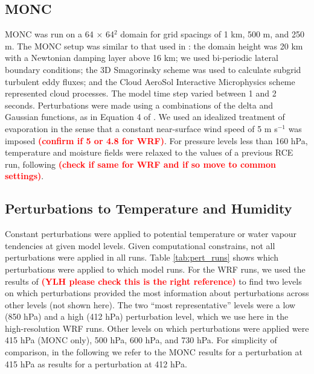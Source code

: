 \documentclass[draft]{agujournal2019}
\newcommand{\todo}[1]{\textcolor{red}{\textbf{(#1)}}}
\begin{document}
\subsection{MONC}

MONC was run on a 64 $\times$ 64$^2$ domain for grid spacings of 1 km, 500 m,
and 250 m. The MONC setup was similar to that used in :
the domain height was 20 km with a Newtonian damping layer above 16 km; we used
bi-periodic lateral boundary conditions; the 3D Smagorinsky scheme was used to
calculate subgrid turbulent eddy fluxes; and the Cloud AeroSol Interactive
Microphysics \cite<CASIM, see>[and references therein for previous
uses]{Daleu_QJRMS_2023} scheme represented cloud processes. The model time step
varied between 1 and 2 seconds. Perturbations were made using a combinations of
the delta and Gaussian functions, as in Equation 4 of .
We used an idealized treatment of evaporation in the sense that a constant
near-surface wind speed of 5 m s$^{-1}$ was imposed \todo{confirm if 5 or 4.8
for WRF}. For pressure levels less than 160 hPa, temperature and moisture fields
were relaxed to the values of a previous RCE run, following
\cite{Herman_JAMES_2013} \todo{check if same for WRF and if so move to common
settings}.

\subsection{Perturbations to Temperature and Humidity}

Constant perturbations were applied to potential temperature or water vapour
tendencies at given model levels. Given computational constrains, not all
perturbations were applied in all runs.  Table \ref{tab:pert_runs} shows which
perturbations were applied to which model runs. For the WRF runs, we used the
results of \cite{Hwong_JAMES_2021} \todo{YLH please check this is the right
reference} to find two levels on which perturbations provided the most
information about perturbations across other levels (not shown here). The two
``most representative'' levels were a low (850 hPa) and a high (412 hPa)
perturbation level, which we use here in the high-resolution WRF runs. Other
levels on which perturbations were applied were 415 hPa (MONC only), 500 hPa,
600 hPa, and 730 hPa. For simplicity of comparison, in the following we refer to
the MONC results for a perturbation at 415 hPa as results for a perturbation at
412 hPa.
\end{document}
